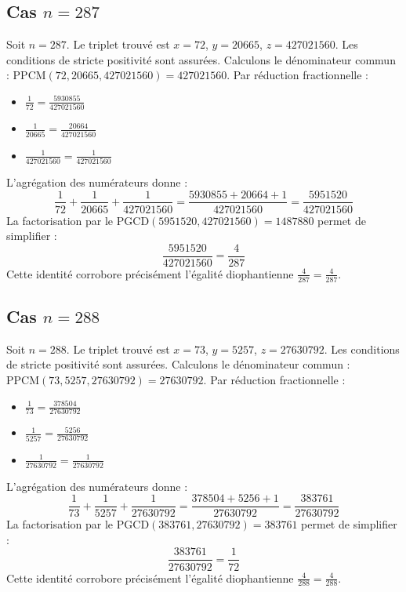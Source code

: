 \documentclass[11pt,a4paper]{article}
\begin{document}
\subsection{Cas $n = 287$}
Soit $n = 287$. Le triplet trouvé est $x = 72$, $y = 20665$, $z = 427021560$.
Les conditions de stricte positivité sont assurées.
Calculons le dénominateur commun : $\text{PPCM}(72, 20665, 427021560) = 427021560$.
Par réduction fractionnelle :
\begin{itemize}
    \item $\frac{1}{72} = \frac{5930855}{427021560}$
    \item $\frac{1}{20665} = \frac{20664}{427021560}$
    \item $\frac{1}{427021560} = \frac{1}{427021560}$
\end{itemize}
L'agrégation des numérateurs donne :
$$ \frac{1}{72} + \frac{1}{20665} + \frac{1}{427021560} = \frac{5930855 + 20664 + 1}{427021560} = \frac{5951520}{427021560} $$
La factorisation par le $\text{PGCD}(5951520, 427021560) = 1487880$ permet de simplifier :
$$ \frac{5951520}{427021560} = \frac{4}{287} $$
Cette identité corrobore précisément l'égalité diophantienne $\frac{4}{287} = \frac{4}{287}$.

\subsection{Cas $n = 288$}
Soit $n = 288$. Le triplet trouvé est $x = 73$, $y = 5257$, $z = 27630792$.
Les conditions de stricte positivité sont assurées.
Calculons le dénominateur commun : $\text{PPCM}(73, 5257, 27630792) = 27630792$.
Par réduction fractionnelle :
\begin{itemize}
    \item $\frac{1}{73} = \frac{378504}{27630792}$
    \item $\frac{1}{5257} = \frac{5256}{27630792}$
    \item $\frac{1}{27630792} = \frac{1}{27630792}$
\end{itemize}
L'agrégation des numérateurs donne :
$$ \frac{1}{73} + \frac{1}{5257} + \frac{1}{27630792} = \frac{378504 + 5256 + 1}{27630792} = \frac{383761}{27630792} $$
La factorisation par le $\text{PGCD}(383761, 27630792) = 383761$ permet de simplifier :
$$ \frac{383761}{27630792} = \frac{1}{72} $$
Cette identité corrobore précisément l'égalité diophantienne $\frac{4}{288} = \frac{4}{288}$.
\end{document}
